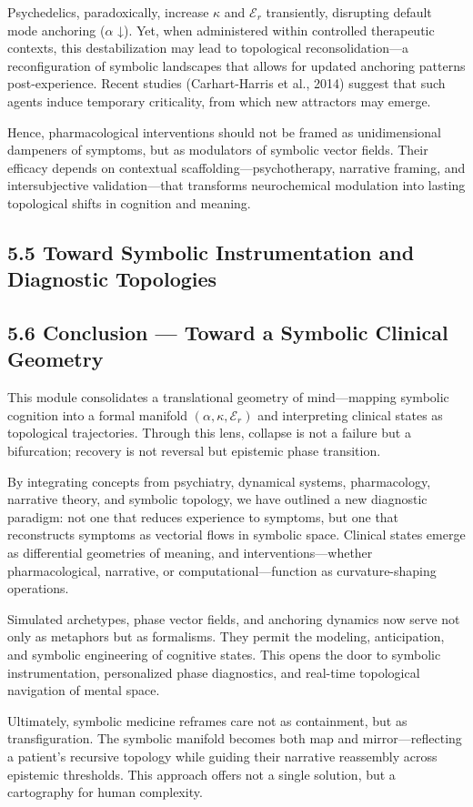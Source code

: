 Psychedelics, paradoxically, increase $\kappa$ and $\mathcal{E}_r$ transiently, disrupting default mode anchoring ($\alpha$ ↓). Yet, when administered within controlled therapeutic contexts, this destabilization may lead to topological reconsolidation—a reconfiguration of symbolic landscapes that allows for updated anchoring patterns post-experience. Recent studies (Carhart-Harris et al., 2014\cite{CarhartHarris2014}) suggest that such agents induce temporary criticality, from which new attractors may emerge.

Hence, pharmacological interventions should not be framed as unidimensional dampeners of symptoms, but as modulators of symbolic vector fields. Their efficacy depends on contextual scaffolding—psychotherapy, narrative framing, and intersubjective validation—that transforms neurochemical modulation into lasting topological shifts in cognition and meaning.

\subsection*{5.5 Toward Symbolic Instrumentation and Diagnostic Topologies}

\subsection*{5.6 Conclusion — Toward a Symbolic Clinical Geometry}

This module consolidates a translational geometry of mind—mapping symbolic cognition into a formal manifold $(\alpha, \kappa, \mathcal{E}_r)$ and interpreting clinical states as topological trajectories. Through this lens, collapse is not a failure but a bifurcation; recovery is not reversal but epistemic phase transition.

By integrating concepts from psychiatry, dynamical systems, pharmacology, narrative theory, and symbolic topology, we have outlined a new diagnostic paradigm: not one that reduces experience to symptoms, but one that reconstructs symptoms as vectorial flows in symbolic space. Clinical states emerge as differential geometries of meaning, and interventions—whether pharmacological, narrative, or computational—function as curvature-shaping operations.

Simulated archetypes, phase vector fields, and anchoring dynamics now serve not only as metaphors but as formalisms. They permit the modeling, anticipation, and symbolic engineering of cognitive states. This opens the door to symbolic instrumentation, personalized phase diagnostics, and real-time topological navigation of mental space.

Ultimately, symbolic medicine reframes care not as containment, but as transfiguration. The symbolic manifold becomes both map and mirror—reflecting a patient’s recursive topology while guiding their narrative reassembly across epistemic thresholds. This approach offers not a single solution, but a cartography for human complexity.